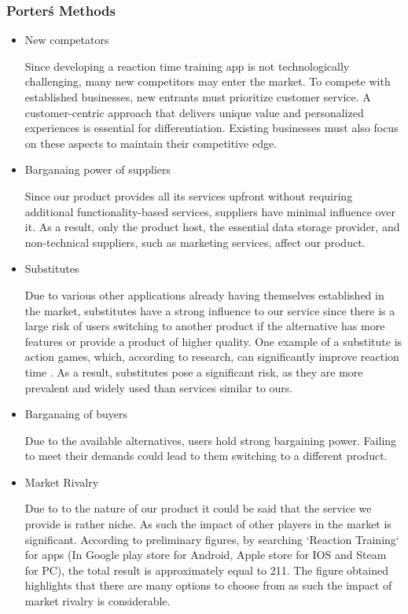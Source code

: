 \documentclass[]{VUMIFTemplateClass}
\begin{document}
\subsubsection{Porter\'s Methods}
\begin{itemize}
 \item New competators

Since developing a reaction time training app is not technologically challenging, many new competitors may enter the market. To compete with established businesses, new entrants must prioritize customer service. A customer-centric approach that delivers unique value and personalized experiences is essential for differentiation\cite{competitiveEdge}. Existing businesses must also focus on these aspects to maintain their competitive edge.
 \item Barganaing power of suppliers


Since our product provides all its services upfront without requiring additional functionality-based services, suppliers have minimal influence over it. As a result, only the product host, the essential data storage provider, and non-technical suppliers, such as marketing services, affect our product.

 \item Substitutes

 Due to various other applications already having themselves established in the market, substitutes have a strong influence to our service since there is a large risk of users switching to another product if the alternative has more features or provide a product of higher quality. One example of a substitute is action games, which, according to research, can significantly improve reaction time \cite{VideoGamesReaction}. As a result, substitutes pose a significant risk, as they are more prevalent and widely used than services similar to ours.

 \item Barganaing of buyers

Due to the available alternatives, users hold strong bargaining power. Failing to meet their demands could lead to them switching to a different product.
 
 \item Market Rivalry

 Due to to the nature of our product it could be said that the service we provide is rather niche. As such the impact of other players in the market is significant. According to preliminary figures, by searching `Reaction Training` for apps (In Google play store for Android, Apple store for IOS and Steam for PC), the total result is approximately equal to 211. The figure obtained highlights that there are many options to choose from as such the impact of market rivalry is considerable.
\end{itemize}
\end{document}
